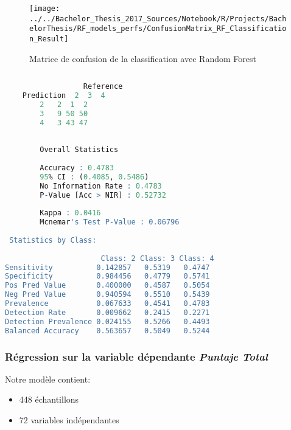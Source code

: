 \begin{figure}[H]
	\centering
	\texttt{[image: ../../Bachelor\_Thesis\_2017\_Sources/Notebook/R/Projects/BachelorThesis/RF\_models\_perfs/ConfusionMatrix\_RF\_Classification\_Result]}
	\caption{Matrice de confusion de la classification avec Random Forest}
	\label{fig:confusionmatrixrfclassificationresult}
\end{figure}

\begin{minipage}{\linewidth}
	
	\begin{lstlisting}[showstringspaces=false,language=R, caption={Test du modèle de classification},captionpos=b]
		
		          Reference
	Prediction  2  3  4
		2   2  1  2
		3   9 50 50
		4   3 43 47
		
		
		Overall Statistics
		
		Accuracy : 0.4783          
		95% CI : (0.4085, 0.5486)
		No Information Rate : 0.4783          
		P-Value [Acc > NIR] : 0.52732         
		
		Kappa : 0.0416          
		Mcnemar's Test P-Value : 0.06796         
		
 Statistics by Class:
		
                      Class: 2 Class: 3 Class: 4
Sensitivity          0.142857   0.5319   0.4747
Specificity          0.984456   0.4779   0.5741
Pos Pred Value       0.400000   0.4587   0.5054
Neg Pred Value       0.940594   0.5510   0.5439
Prevalence           0.067633   0.4541   0.4783
Detection Rate       0.009662   0.2415   0.2271
Detection Prevalence 0.024155   0.5266   0.4493
Balanced Accuracy    0.563657   0.5049   0.5244
	\end{lstlisting}
\end{minipage}






\newpage
\subsubsection{Régression sur la variable dépendante \textit{Puntaje Total}}
\noindent Notre modèle contient: 
\begin{itemize}
	\item 448 échantillons
	\item 72 variables indépendantes
\end{itemize}


